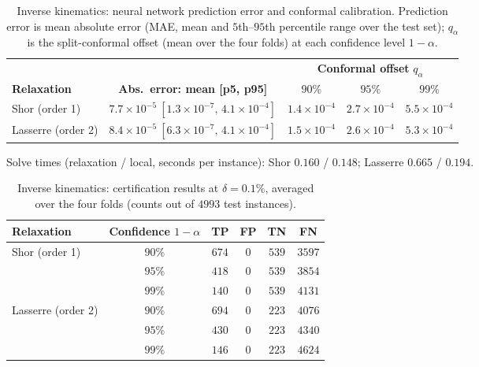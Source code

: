 \documentclass[10pt]{article} %
\theoremstyle{plain}
\theoremstyle{definition}
\theoremstyle{remark}
\begin{document}
\begin{table}[H]
\centering
\caption{Inverse kinematics: neural network prediction error and conformal calibration. Prediction error is mean absolute error (MAE, mean and $5$th--$95$th percentile range over the test set); $q_\alpha$ is the split-conformal offset (mean over the four folds) at each confidence level $1 - \alpha$.}
\begin{tabular}{lcccc}
\toprule
& & \multicolumn{3}{c}{\textbf{Conformal offset } $q_\alpha$} \\
\cmidrule(lr){3-5}
\textbf{Relaxation} & \textbf{Abs.\ error: mean [p5, p95]} & $90\%$ & $95\%$ & $99\%$ \\
\midrule
Shor (order 1)     & $7.7\!\times\!10^{-5}\ [1.3\!\times\!10^{-7},\, 4.1\!\times\!10^{-4}]$ & $1.4\!\times\!10^{-4}$ & $2.7\!\times\!10^{-4}$ & $5.5\!\times\!10^{-4}$ \\
Lasserre (order 2) & $8.4\!\times\!10^{-5}\ [6.3\!\times\!10^{-7},\, 4.1\!\times\!10^{-4}]$ & $1.5\!\times\!10^{-4}$ & $2.6\!\times\!10^{-4}$ & $5.3\!\times\!10^{-4}$ \\
\bottomrule
\end{tabular}
\label{tab:IK-error}
\end{table}
{\footnotesize \noindent Solve times (relaxation / local, seconds per instance): Shor $0.160$ / $0.148$; Lasserre $0.665$ / $0.194$.}

\begin{table}[H]
\centering
\caption{Inverse kinematics: certification results at $\delta = 0.1\%$, averaged over the four folds (counts out of $4993$ test instances).}
\begin{tabular}{lc cccc}
\toprule
\textbf{Relaxation} & \textbf{Confidence } $1-\alpha$ & \textbf{TP} & \textbf{FP} & \textbf{TN} & \textbf{FN} \\
\midrule
\multirow{3}{*}{Shor (order 1)}
 & $90\%$ & $674$ & $0$ & $539$ & $3597$ \\
 & $95\%$ & $418$ & $0$ & $539$ & $3854$ \\
 & $99\%$ & $140$ & $0$ & $539$ & $4131$ \\
\midrule
\multirow{3}{*}{Lasserre (order 2)}
 & $90\%$ & $694$ & $0$ & $223$ & $4076$ \\
 & $95\%$ & $430$ & $0$ & $223$ & $4340$ \\
 & $99\%$ & $146$ & $0$ & $223$ & $4624$ \\
\bottomrule
\end{tabular}
\label{tab:IK-cert}
\end{table}
\end{document}
